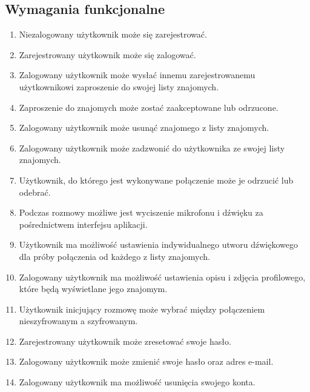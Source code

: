 \documentclass{article}
\begin{document}
  \subsection{Wymagania funkcjonalne}
  \begin{enumerate}
    \item Niezalogowany użytkownik może się zarejestrować.
    \item Zarejestrowany użytkownik może się zalogować.
    \item Zalogowany użytkownik może wysłać innemu zarejestrowanemu użytkownikowi zaproszenie do swojej listy znajomych.
    \item Zaproszenie do znajomych może zostać zaakceptowane lub odrzucone.
    \item Zalogowany użytkownik może usunąć znajomego z listy znajomych.
    \item Zalogowany użytkownik może zadzwonić do użytkownika ze swojej listy znajomych.
    \item Użytkownik, do którego jest wykonywane połączenie może je odrzucić lub odebrać.
    \item Podczas rozmowy możliwe jest wyciszenie mikrofonu i dźwięku za pośrednictwem interfejsu aplikacji.
    \item Użytkownik ma możliwość ustawienia indywidualnego utworu dźwiękowego dla próby połączenia od każdego z listy znajomych.
    \item Zalogowany użytkownik ma możliwość ustawienia opisu i zdjęcia profilowego, które będą wyświetlane jego znajomym.
    \item Użytkownik inicjujący rozmowę może wybrać między połączeniem nieszyfrowanym a szyfrowanym.
    \item Zarejestrowany użytkownik może zresetować swoje hasło.
    \item Zalogowany użytkownik może zmienić swoje hasło oraz adres e-mail.
    \item Zalogowany użytkownik ma możliwość usunięcia swojego konta.
  \end{enumerate}
\end{document}
